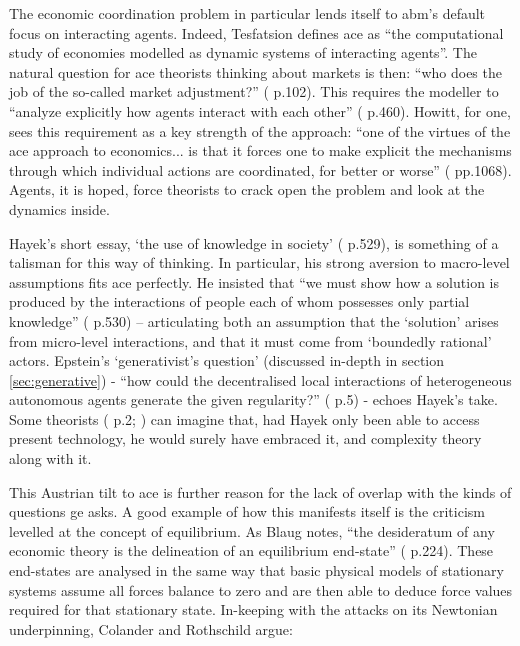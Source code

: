 The economic coordination problem in particular lends itself to \gls{abm}'s default focus on interacting agents. Indeed, Tesfatsion defines \gls{ace} as ``the computational study of economies modelled as dynamic systems of interacting agents''. The natural question for \gls{ace} theorists thinking about markets is then: ``who does the job of the so-called market adjustment?'' (\citealt{consiglio_artificial_2007-1} p.102). This requires the modeller to ``analyze explicitly how agents interact with each other'' (\citealt{kirman_evolving_2001} p.460). Howitt, for one, sees this requirement as a key strength of the approach: ``one of the virtues of the \gls{ace} approach to economics... is that it forces one to make explicit the mechanisms through which individual actions are coordinated, for better or worse'' (\citealt{howitt_coordination_2006} pp.1068). Agents, it is hoped, force theorists to crack open the problem and look at the dynamics inside.

Hayek's short essay, `the use of knowledge in society' (\citealt{hayek_use_1945} p.529), is something of a talisman for this way of thinking. In particular, his strong aversion to macro-level assumptions fits \gls{ace} perfectly. He insisted that ``we must show how a solution is produced by the interactions of people each of whom possesses only partial knowledge'' (\citealt{hayek_use_1945} p.530) – articulating both an assumption that the `solution' arises from micro-level interactions, and that it must come from `boundedly rational' actors. Epstein's `generativist's question' (discussed in-depth in section \ref{sec:generative}) -  ``how could the decentralised local interactions of heterogeneous autonomous agents generate the given regularity?'' (\citealt{epstein_generative_2006} p.5) - echoes Hayek's take. Some theorists (\citealt{vriend_was_2002} p.2; \citealt{miller_complex_2007}) can imagine that, had Hayek only been able to access present technology, he would surely have embraced it, and complexity theory along with it.

This Austrian tilt to \gls{ace} is further reason for the lack of overlap with the kinds of questions \gls{ge} asks. A good example of how this manifests itself is the criticism levelled at the concept of equilibrium. As Blaug notes, ``the desideratum of any economic theory is the delineation of an equilibrium end-state'' (\citealt{blaug_trade-off_2009} p.224). These end-states are analysed in the same way that basic physical models of stationary systems assume all forces balance to zero and are then able to deduce force values required for that stationary state. In-keeping with the attacks on its Newtonian underpinning, Colander and Rothschild argue:
	

